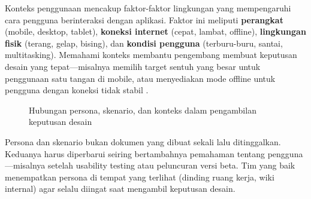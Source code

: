 Konteks penggunaan mencakup faktor-faktor lingkungan yang mempengaruhi cara pengguna berinteraksi dengan aplikasi. Faktor ini meliputi \textbf{perangkat} (mobile, desktop, tablet), \textbf{koneksi internet} (cepat, lambat, offline), \textbf{lingkungan fisik} (terang, gelap, bising), dan \textbf{kondisi pengguna} (terburu-buru, santai, multitasking). Memahami konteks membantu pengembang membuat keputusan desain yang tepat---misalnya memilih target sentuh yang besar untuk penggunaan satu tangan di mobile, atau menyediakan mode offline untuk pengguna dengan koneksi tidak stabil \cite{webdevLearn}.

\begin{figure}[htbp]
\centering
{}
\caption{Hubungan persona, skenario, dan konteks dalam pengambilan keputusan desain}
\end{figure}

\begin{catatan}
Persona dan skenario bukan dokumen yang dibuat sekali lalu ditinggalkan. Keduanya harus diperbarui seiring bertambahnya pemahaman tentang pengguna---misalnya setelah usability testing atau peluncuran versi beta. Tim yang baik menempatkan persona di tempat yang terlihat (dinding ruang kerja, wiki internal) agar selalu diingat saat mengambil keputusan desain.
\end{catatan}
